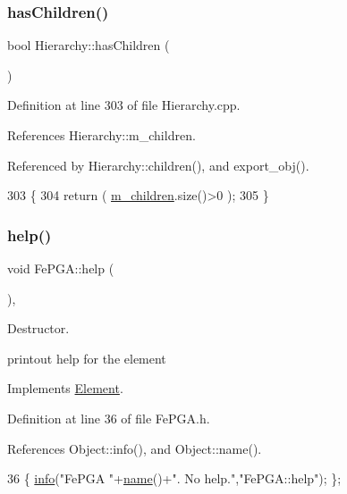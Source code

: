 \subsubsection{\texorpdfstring{has\+Children()}{hasChildren()}}
{\footnotesize\ttfamily bool Hierarchy\+::has\+Children (\begin{DoxyParamCaption}{ }\end{DoxyParamCaption})\hspace{0.3cm}{\ttfamily [inherited]}}



Definition at line 303 of file Hierarchy.\+cpp.



References Hierarchy\+::m\+\_\+children.



Referenced by Hierarchy\+::children(), and export\+\_\+obj().


\begin{DoxyCode}
303                               \{
304   \textcolor{keywordflow}{return} ( \hyperlink{classHierarchy_a038816763941fd4a930504917f60483b}{m\_children}.size()>0 );
305 \}
\end{DoxyCode}
\mbox{\label{classFePGA_ae6425fbad1a8db57025efaf387a6f41b}} 
\subsubsection{\texorpdfstring{help()}{help()}}
{\footnotesize\ttfamily void Fe\+P\+G\+A\+::help (\begin{DoxyParamCaption}{ }\end{DoxyParamCaption})\hspace{0.3cm}{\ttfamily [inline]}, {\ttfamily [virtual]}}



Destructor. 

printout help for the element 

Implements \hyperlink{classElement_a32c0de27acb08e17251cef88c3e9303a}{Element}.



Definition at line 36 of file Fe\+P\+G\+A.\+h.



References Object\+::info(), and Object\+::name().


\begin{DoxyCode}
36 \{ \hyperlink{classObject_a644fd329ea4cb85f54fa6846484b84a8}{info}(\textcolor{stringliteral}{"FePGA "}+\hyperlink{classObject_a300f4c05dd468c7bb8b3c968868443c1}{name}()+\textcolor{stringliteral}{". No help."},\textcolor{stringliteral}{"FePGA::help"}); \};
\end{DoxyCode}
\mbox{\label{classFePGA_a1553db5010cce9e3495aa3060baf0b3c}} 
